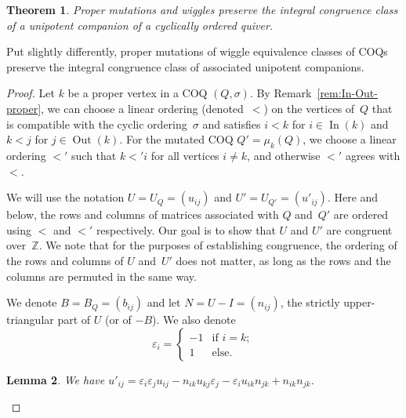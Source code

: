 \documentclass[11pt, letterpaper]{amsart}
\newtheorem{theorem}{Theorem}[section]
\newtheorem{lemma}[theorem]{Lemma}
\theoremstyle{definition}
\numberwithin{equation}{section}
\def\ZZ{{\mathbb Z}}
\def\In{{\operatorname{In}}}
\def\Out{{\operatorname{Out}}}
\begin{document}

\begin{theorem}
\label{thm:I-N-action}
 Proper mutations and wiggles preserve the integral congruence class of a unipotent companion of a cyclically ordered quiver.
\end{theorem}

Put slightly differently, proper mutations of wiggle equivalence classes of COQs
preserve the integral congruence class of associated unipotent companions. 

\begin{proof} %
Let $k$ be a proper vertex in a COQ $(Q,\sigma)$. 
By Remark~\ref{rem:In-Out-proper}, we can choose a linear ordering (denoted~$<$) on the vertices of~$Q$ 
that is compatible with the cyclic ordering~$\sigma$ and 
satisfies $i<k$ for $i\in\In(k)$
and  $k <j$ for $j\in\Out(k)$.
For the mutated COQ $Q'=\mu_k(Q)$, we choose a linear ordering $<'$ such that 
$k <' i$ for all vertices $i\ne k$, and otherwise $<'$ agrees with $<$. 

We will use the notation $U = U_Q = (u_{ij})$ and $U' = U_{Q'} = (u'_{ij})$. 
Here and below, the rows and columns of matrices associated with $Q$ and~$Q'$ 
are ordered using $<$ and $<'$ respectively.
Our goal is to show that $U$ and $U'$ are congruent over~$\ZZ$. 
We note that for the purposes of establishing congruence, the ordering of the rows and columns of $U$ and~$U'$
does not matter, as long as the rows and the columns are permuted in the same way. 

We denote $B=B_Q=(b_{ij})$ and let $N=U-I=(n_{ij})$, the strictly upper-triangular part of $U$ (or of $-B$). 
We also denote
\begin{equation*}
\varepsilon_i = 
\begin{cases} -1 & \text{if } i=k; \\ 
1 & \text{else.}
\end{cases}
\end{equation*}


\begin{lemma}
\label{lem:U mutation matrix}
We have 
$u'_{ij} = \varepsilon_i \varepsilon_j u_{ij} - n_{i k} u_{k j} \varepsilon_j - \varepsilon_i u_{i k} n_{j k} + n_{i k} n_{j k}$.
\end{lemma}


\end{proof}
\end{document}
